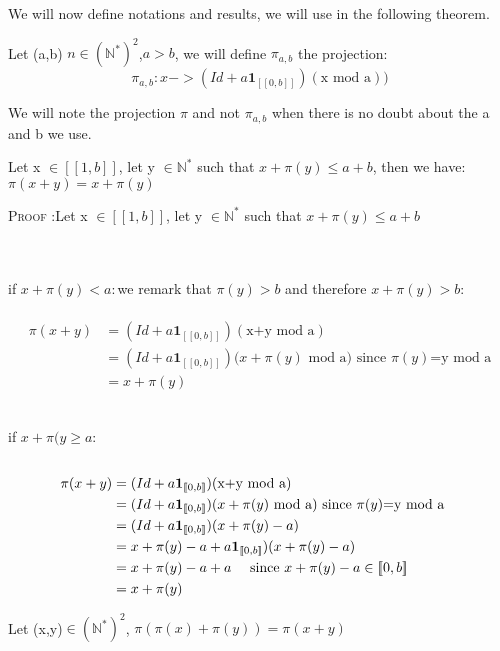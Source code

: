We will now define notations and results, we will use in the following theorem. 

\begin{notation}

Let (a,b) \(n \in (\mathbb{N}^*)^2\),\(a>b\), we will define \(\pi_{a,b}\) the projection:
\[ \pi_{a,b}:x->(Id+a\mathbf{1}_{ [\![0,b]\!]})(\text{x mod a}))\]
\end{notation}
 
We will note  the projection \(\pi\) and not \(\pi_{a,b}\) when there is no doubt about the a and b we use.

\begin{Proposition}
Let x \(\in [\![1,b]\!]\), let y \(\in \mathbb{N}^*\) such that \(x+\pi(y)\leqslant a+b\), then we have: \(\pi(x+y)=x+\pi(y)\)
\end{Proposition}

\textsc{Proof :}Let x \(\in [\![1,b]\!]\), let y \(\in \mathbb{N}^*\) such that \(x+\pi(y)\leqslant a+b\)

\\\\if \(x+\pi(y)< a:\)we remark that \(\pi(y)>b\) and therefore \(x+\pi(y)>b\):

\begin{align*}
 \\\pi(x+y) & = (Id+a\mathbf{1}_{ [\![0,b]\!]})(\text{x+y mod a})\\
& = (Id+a\mathbf{1}_{ [\![0,b]\!]})(x+\pi(y)\text{ mod a) since } \pi(y)\text{=y mod a} \\
& =x+ \pi(y)
\end{align*}

\\if \(x+\pi(y\geqslant a\):
\begin{align*}
 \\\pi(x+y) & = (Id+a\mathbf{1}_{ [\![0,b]\!]})(\text{x+y mod a})\\
& = (Id+a\mathbf{1}_{ [\![0,b]\!]})(x+\pi(y)\text{ mod a) since } \pi(y)\text{=y mod a} \\
& = (Id+a\mathbf{1}_{ [\![0,b]\!]})(x+\pi(y) - a) \\
& = x+\pi(y) - a +a\mathbf{1}_{ [\![0,b]\!]})(x+\pi(y) - a) \\
& = x+\pi(y) - a +a \text{ \quad since } x+\pi(y) - a \in [\![0,b]\!] \\
& = x+\pi(y)
\end{align*}


\begin{Proposition}
Let (x,y)\(\in (\mathbb{N}^*)^2\), \(\pi(\pi(x)+\pi(y))=\pi(x+y)\)
\end{Proposition}

